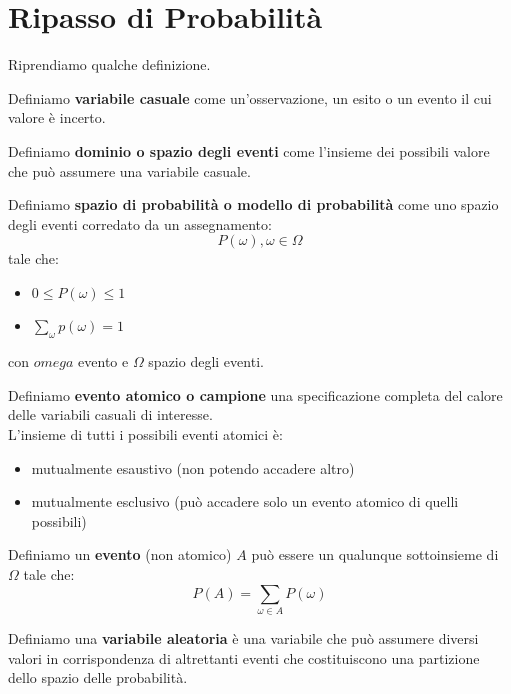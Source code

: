 \message{ !name(modprob.tex)}\documentclass[a4paper,12pt, oneside]{book}
\begin{document}
\chapter{Ripasso di Probabilità}
Riprendiamo qualche definizione.
\begin{definizione}
  Definiamo \textbf{variabile casuale} come un'osservazione, un esito o un
  evento il cui valore è incerto.
\end{definizione}
\begin{definizione}
  Definiamo \textbf{dominio o spazio degli eventi} come l'insieme dei possibili
  valore che può assumere una variabile casuale.
\end{definizione}
\begin{definizione}
  Definiamo \textbf{spazio di probabilità o modello di probabilità} come uno
  spazio degli eventi corredato da un assegnamento:
  \[P(\omega),\omega\in \Omega\]
  tale che:
  \begin{itemize}
    \item $0\leq P(\omega)\leq 1$
    \item $\sum_\omega p(\omega)=1$
  \end{itemize}
  con $omega$ evento e $\Omega$ spazio degli eventi.
\end{definizione}
\begin{definizione}
  Definiamo \textbf{evento atomico o campione} una specificazione completa del
  calore delle variabili casuali di interesse.\\
  L'insieme di tutti i possibili eventi atomici è:
  \begin{itemize}
    \item mutualmente esaustivo (non potendo accadere altro)
    \item mutualmente esclusivo (può accadere solo un evento atomico di quelli
    possibili) 
  \end{itemize}
\end{definizione}
\begin{definizione}
  Definiamo un \textbf{evento} (non atomico) $A$ può essere un qualunque
  sottoinsieme di $\Omega$ tale che: 
  \[P(A)=\sum_{\omega\in A}P(\omega)\]
\end{definizione}
\begin{definizione}
  Definiamo una \textbf{variabile aleatoria} è una variabile che può assumere
  diversi valori in corrispondenza di altrettanti eventi che costituiscono una
  partizione dello spazio delle probabilità.
\end{definizione}
\end{document}
